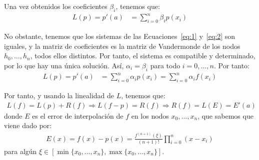 \begin{ejercicio}
    Una vez obtenidos los coeficientes $\beta_i$, tenemos que:
    \begin{align*}
        L(p) = p'(a) &= \sum_{i=0}^n \beta_i p(x_i)
    \end{align*}

    No obstante, tenemos que los sistemas de las Ecuaciones~\eqref{eq:1} y~\eqref{eq:2} son iguales, y la matriz de coeficientes es la matriz de Vandermonde de los nodos $h_0,\dots,h_n$, todos ellos distintos. Por tanto, el sistema es compatible y determinado, por lo que hay una única solución. Así, $\alpha_i=\beta_i$ para todo $i=0,\dots,n$. Por tanto:
    \begin{align*}
        L(p) = p'(a) &= \sum_{i=0}^n \alpha_i p(x_i) = \sum_{i=0}^n \alpha_i f(x_i)
    \end{align*}

    Por tanto, y usando la linealidad de $L$, tenemos que:
    \begin{align*}
        L(f)=L(p)+R(f)\Longrightarrow
        L(f-p)=R(f)
        \Longrightarrow R(f)=L(E)=E'(a)
    \end{align*}
    donde $E$ es el error de interpolación de $f$ en los nodos $x_0,\dots,x_n$, que sabemos que viene dado por:
    \begin{align*}
        E(x) = f(x) - p(x) = \frac{f^{(n+1)}(\xi)}{(n+1)!}\prod_{i=0}^n(x-x_i)
    \end{align*}
    para algún $\xi\in \left[\min\{x_0,\dots,x_n\},\max\{x_0,\dots,x_n\}\right]$.
    

\end{ejercicio}